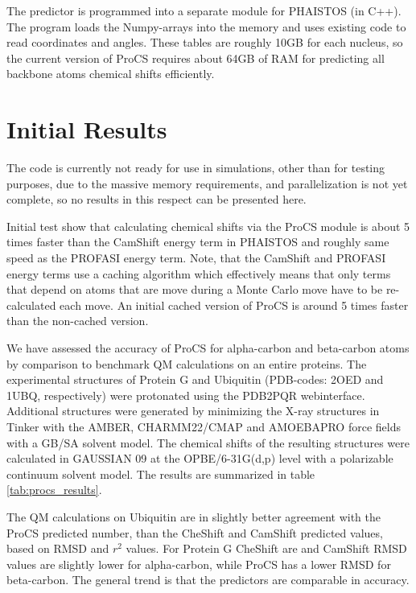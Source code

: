 The predictor is programmed into a separate module for PHAISTOS (in C++).
The program loads the Numpy-arrays into the memory and uses existing code to read coordinates and angles.
These tables are roughly 10GB for each nucleus, so the current version of ProCS requires about 64GB of RAM for predicting all backbone atoms chemical shifts efficiently.


\section{Initial Results}
The code is currently not ready for use in simulations, other than for testing purposes, due to the massive memory requirements, and parallelization is not yet complete, so no results in this respect can be presented here.

Initial test show that calculating chemical shifts via the ProCS module is about 5 times faster than the CamShift energy term in PHAISTOS and roughly same speed as the PROFASI energy term.
Note, that the CamShift and PROFASI energy terms use a caching algorithm which effectively means that only terms that depend on atoms that are move during a Monte Carlo move have to be re-calculated each move.
An initial cached version of ProCS is around 5 times faster than the non-cached version.

We have assessed the accuracy of ProCS for alpha-carbon and beta-carbon atoms by comparison to benchmark QM calculations on an entire proteins.
The experimental structures of Protein G and Ubiquitin (PDB-codes: 2OED and 1UBQ, respectively) were protonated using the PDB2PQR webinterface\cite{pdb2pqr1,pdb2pqr2}.
Additional structures were generated by minimizing the X-ray structures in Tinker with the AMBER, CHARMM22/CMAP and AMOEBAPRO force fields with a GB/SA solvent model.
The chemical shifts of the resulting structures were calculated in GAUSSIAN 09 \cite{g09} at the OPBE/6-31G(d,p) level with a polarizable continuum solvent model. The results are summarized in table \ref{tab:procs_results}.

The QM calculations on Ubiquitin are in slightly better agreement with the ProCS predicted number, than the CheShift and CamShift predicted values, based on RMSD and $r^2$ values. For Protein G CheShift are and CamShift RMSD values are slightly lower for alpha-carbon, while ProCS has a lower RMSD for beta-carbon.
The general trend is that the predictors are comparable in accuracy.





